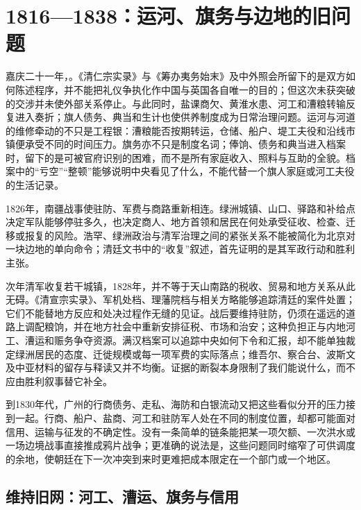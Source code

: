 

\section{1816—1838：运河、旗务与边地的旧问题}

嘉庆二十一年，。《清仁宗实录》与《筹办夷务始末》及中外照会所留下的是双方如何陈述程序，并不能把礼仪争执化作中国与英国各自唯一的目的；但这次未获突破的交涉并未使外部关系停止。与此同时，盐课商欠、黄淮水患、河工和漕粮转输反复进入奏折；旗人债务、典当和生计也使供养制度成为日常治理问题。运河与河道的维修牵动的不只是工程银：漕粮能否按期转运，仓储、船户、堤工夫役和沿线市镇便承受不同的时间压力。旗务亦不只是制度名词；俸饷、债务和典当进入档案时，留下的是可被官府识别的困难，而不是所有家庭收入、照料与互助的全貌。档案中的“亏空”“整顿”能够说明中央看见了什么，不能代替一个旗人家庭或河工夫役的生活记录。

1826年，南疆战事使驻防、军费与商路重新相连。绿洲城镇、山口、驿路和补给点决定军队能够停驻多久，也决定商人、地方首领和居民在何处承受征收、检查、迁移或报复的风险。浩罕、绿洲政治与清军治理之间的紧张关系不能被简化为北京对一块边地的单向命令；清廷文书中的“收复”叙述，首先证明的是其军政行动和胜利主张。

次年清军收复若干城镇，1828年，并不等于天山南路的税收、贸易和地方关系从此无碍。《清宣宗实录》、军机处档、理藩院档与相关方略能够追踪清廷的案件处置；它们不能替地方反应和处决过程作无缝的见证。战后要维持驻防，仍须在遥远的道路上调配粮饷，并在地方社会中重新安排征税、市场和治安；这种负担正与内地河工、漕运和赈务争夺资源。满汉档案可以追踪中央如何下令和汇报，却不能单独裁定绿洲居民的态度、迁徙规模或每一项军费的实际落点；维吾尔、察合台、波斯文及中亚材料的留存与释读又并不均衡。证据的断裂本身限制了我们能说什么，而不应由胜利叙事替它补全。

到1830年代，广州的行商债务、走私、海防和白银流动又把这些看似分开的压力接到一起。行商、船户、盐商、河工和驻防军人处在不同的制度位置，却都可能面对信用、运输与征发的不确定性。没有一条简单的链条能把某一项欠额、一次洪水或一场边境战事直接推成鸦片战争；更准确的说法是，这些问题同时缩窄了可供调度的余地，使朝廷在下一次冲突到来时更难把成本限定在一个部门或一个地区。

\subsection{维持旧网：河工、漕运、旗务与信用}


